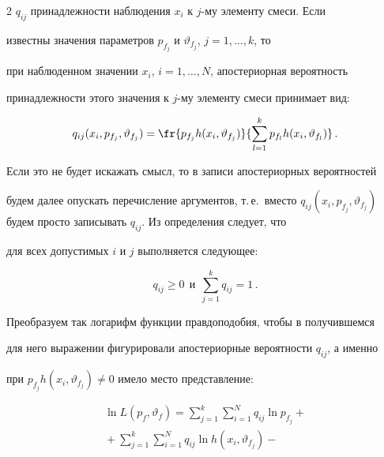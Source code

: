 \begin{multicols}{2}
$q_{ij}$ принадлежности наблюдения $x_i$ к $j$-му элементу смеси. Если 


известны значения параметров $p_{f_j}$ и $\vartheta_{f_j}$, $j=1,\ldots , k$, то 


при наблюденном значении $x_i$, $i=1,\ldots , N$, апостериорная вероятность 


принадлежности этого значения к  $j$-му элементу смеси принимает вид:


     \begin{equation}


     q_{ij} (x_i, p_{f_j}, \vartheta_{f_j}) = \fr{p_{f_j} h(x_i, 


\vartheta_{f_j})}{\sum\limits_{l=1}^k p_{f_l} h(x_i, \vartheta_{f_l})}\,.


     \label{e5kr}


     \end{equation}


     


     Если это не будет искажать смысл, то в записи апостериорных вероятностей 


будем далее опускать перечисление аргументов, т.\,е.\ вместо $q_{ij}(x_i, p_{f_j}, 


\vartheta_{f_j})$ будем просто записывать $q_{ij}$. Из определения следует, что 


для всех допустимых $i$ и $j$ выполняется следующее: 


     $$


     q_{ij} \geq 0\ \ \mbox{и}\  \ \sum\limits_{j=1}^k q_{ij}=1\,.


     $$


     


     Преобразуем так логарифм функции правдоподобия, чтобы в получившемся 


для него выражении фигурировали апостериорные вероятности $q_{ij}$, а именно 


при $p_{f_j} h(x_i,\vartheta_{f_j})\not=0$ имело место представление:


     \begin{multline}


     \ln L(p_f,\vartheta_f ) = \sum\limits_{j=1}^k\sum\limits_{i=1}^N q_{ij}\ln 


p_{f_j} +{}\\


{}+\sum\limits_{j=1}^k\sum\limits_{i=1}^N q_{ij}\ln h(x_i,\vartheta_{f_j})-



\end{multline}
\end{multicols}

